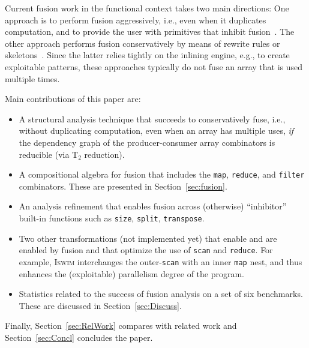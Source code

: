 \documentclass{sigplanconf}  %
\newcommand{\mymath}[1]{$ #1 $}
\begin{document}
Current fusion work in the functional context takes two main directions:
One approach is to perform fusion aggressively, i.e., even when it duplicates
computation, and to provide the user with primitives that inhibit 
fusion~\cite{keller2010regular,claessen2012expressive}.
The other approach performs fusion conservatively by means of rewrite 
rules or skeletons~\cite{jones2001playing,chakravarty2007data,bergstrom2012nested}.
Since the latter relies tightly on the inlining engine, e.g., to create exploitable 
patterns, these approaches typically do not fuse an array that is used multiple times.

Main contributions of this paper are:
\begin{itemize}
    \item A structural analysis technique
            that succeeds to conservatively fuse, 
            i.e., without duplicating computation, 
            even when an array has multiple uses, {\em if} 
            the dependency graph of the producer-consumer 
            array combinators is reducible 
            (via T$_2$ reduction). 
    \item A compositional algebra for fusion that
            includes the {\tt map}, {\tt reduce}, and {\tt filter} combinators.
            These are presented in Section~\ref{sec:fusion}. 
    \item An analysis refinement that enables fusion across
            (otherwise) ``inhibitor'' built-in functions such
            as {\tt size}, {\tt split}, {\tt transpose}. 
    \item Two other transformations (not implemented yet) that enable 
            and are enabled by fusion and that optimize the use of 
            {\tt scan} and {\tt reduce}. For example, \textsc{Iswim}
            interchanges the outer-{\tt scan} with an inner {\tt map} 
            nest, and thus enhances the (exploitable) parallelism 
            degree of the program.
    \item Statistics related to the success of fusion analysis 
            on a set of six benchmarks. 
            These are discussed in Section~\ref{sec:Discuss}.
\end{itemize}
   
Finally, Section~\ref{sec:RelWork} compares with related work and
Section~\ref{sec:Concl} concludes the paper.

\end{document}
